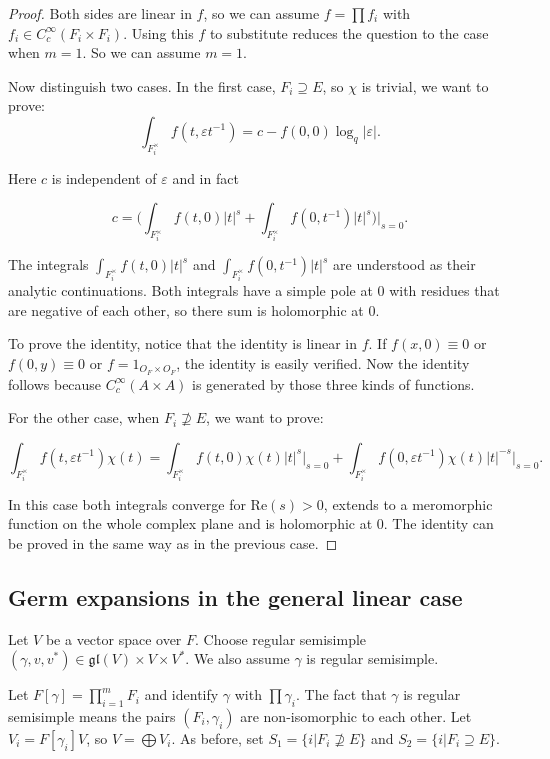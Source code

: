 \documentclass[11pt, oneside,reqno]{amsart}   	%
\begin{document}
\begin{proof}

Both sides are linear in $f$, so we can assume $f=\prod f_i$ with $f_i \in C_c^\infty (F_i \times F_i)$. Using this $f$ to substitute reduces the question to the case when $m=1$. So we can assume $m=1$.

Now distinguish two cases. In the first case, $F_i \supseteq E$, so $\chi$ is trivial, we want to prove:
$$\int_{F_i^\times}f(t,\varepsilon t^{-1})=c-f(0,0)\log_q|\varepsilon|.$$

Here $c$ is independent of $\varepsilon$ and in fact 

$$c=\bigg(\int_{F_i^\times}f(t,0)|t|^s+\int_{F_i^\times}f(0,t^{-1})|t|^s\bigg)\bigg\rvert_{s=0}.$$

The integrals $\int_{F_i^\times}f(t,0)|t|^s$ and $\int_{F_i^\times}f(0,t^{-1})|t|^s$ are understood as their analytic continuations. Both integrals have a simple pole at $0$ with residues that are negative of each other, so there sum is holomorphic at $0$.


To prove the identity, notice that the identity is linear in $f$. If $f(x,0) \equiv 0$ or $f(0,y) \equiv 0$ or $f=1_{O_F \times O_F}$,  the identity is easily verified. Now the identity follows because $C_c^\infty(A \times A)$ is generated by those three kinds of functions.

For the other case, when $F_i \nsupseteq E$, we want to prove:

$$\int_{F_i^\times}f(t,\varepsilon t^{-1})\chi(t)=\int_{F_i^\times}f(t,0)\chi(t)|t|^s\bigg\rvert_{s=0}+\int_{F_i^\times}f(0,\varepsilon t^{-1})\chi(t)|t|^{-s}\bigg\rvert_{s=0}.$$

In this case both integrals converge for Re$(s) > 0$, extends to a meromorphic function on the whole complex plane and is holomorphic at $0$. The identity can be proved in the same way as in the previous case.


\end{proof}

\subsection{Germ expansions in the general linear case} \label{general linear germ}

Let $V$ be a vector space over $F$. Choose regular semisimple $(\gamma, v, v^*) \in \mathfrak{gl}(V) \times V \times V^*$. We also assume $\gamma$ is regular semisimple.


 Let $F[\gamma]=\prod_{i=1}^m F_i$ and identify $\gamma$ with $\prod \gamma_i$. The fact that $\gamma$ is regular semisimple means the pairs $(F_i, \gamma_i )$ are non-isomorphic to each other. Let $V_i=F[\gamma_i]V$, so $V=\bigoplus V_i$. As before, set $S_1=\{i | F_i \nsupseteq E\}$ and $S_2=\{i | F_i \supseteq E\}$. 
\end{document}
